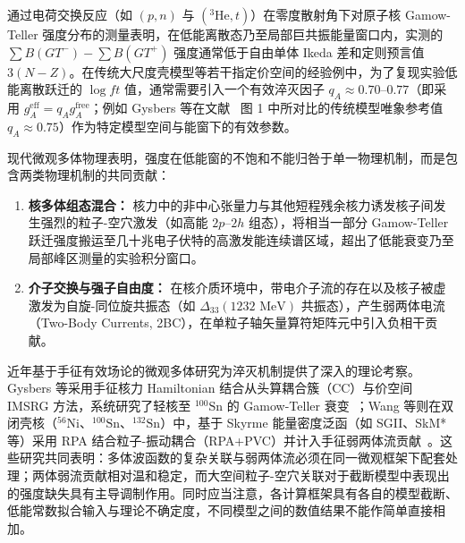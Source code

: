 通过电荷交换反应（如 $(p, n)$ 与 $(^3\mathrm{He}, t)$）在零度散射角下对原子核 Gamow-Teller 强度分布的测量表明，在低能离散态乃至局部巨共振能量窗口内，实测的 $\sum B(GT^-) - \sum B(GT^+)$ 强度通常低于自由单体 Ikeda 差和定则预言值 $3(N-Z)$。在传统大尺度壳模型等若干指定价空间的经验例中，为了复现实验低能离散跃迁的 $\log ft$ 值，通常需要引入一个有效淬灭因子 $q_A \approx 0.70\text{--}0.77$（即采用 $g_A^{\mathrm{eff}} = q_A g_A^{\mathrm{free}}$；例如 Gysbers 等在文献~\cite{gysbers-2019-ab-initio-beta-decay-quenching} 图 1 中所对比的传统模型唯象参考值 $q_A \approx 0.75$）作为特定模型空间与能窗下的有效参数。

现代微观多体物理表明，强度在低能窗的不饱和不能归咎于单一物理机制，而是包含两类物理机制的共同贡献：
\begin{enumerate}
\item \textbf{核多体组态混合：} 核力中的非中心张量力与其他短程残余核力诱发核子间发生强烈的粒子-空穴激发（如高能 $2p\text{--}2h$ 组态），将相当一部分 Gamow-Teller 跃迁强度搬运至几十兆电子伏特的高激发能连续谱区域，超出了低能衰变乃至局部峰区测量的实验积分窗口。
\item \textbf{介子交换与强子自由度：} 在核介质环境中，带电介子流的存在以及核子被虚激发为自旋-同位旋共振态（如 $\Delta_{33}(1232\text{ MeV})$ 共振态），产生弱两体电流（Two-Body Currents, 2BC），在单粒子轴矢量算符矩阵元中引入负相干贡献。
\end{enumerate}

近年基于手征有效场论的微观多体研究为淬灭机制提供了深入的理论考察。Gysbers 等采用手征核力 Hamiltonian 结合从头算耦合簇（CC）与价空间 IMSRG 方法，系统研究了轻核至 $^{100}\mathrm{Sn}$ 的 Gamow-Teller 衰变~\cite{gysbers-2019-ab-initio-beta-decay-quenching}；Wang 等则在双闭壳核（$^{56}\mathrm{Ni}$、$^{100}\mathrm{Sn}$、$^{132}\mathrm{Sn}$）中，基于 Skyrme 能量密度泛函（如 SGII、SkM* 等）采用 RPA 结合粒子-振动耦合（RPA+PVC）并计入手征弱两体流贡献~\cite{wang-2026-axial-coupling-quenching-joint-effects}。这些研究共同表明：多体波函数的复杂关联与弱两体流必须在同一微观框架下配套处理；两体弱流贡献相对温和稳定，而大空间粒子-空穴关联对于截断模型中表现出的强度缺失具有主导调制作用。同时应当注意，各计算框架具有各自的模型截断、低能常数拟合输入与理论不确定度，不同模型之间的数值结果不能作简单直接相加。

